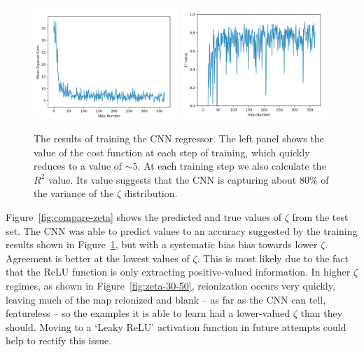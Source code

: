 \begin{figure}
\centering
\includegraphics[width=0.49\textwidth]{chapters/hera_ml/figures/zeta-MSE.png}
\includegraphics[width=0.49\textwidth]{chapters/hera_ml/figures/zeta-R2.png}
\caption[The results of training the CNN regressor.]{The results of training the CNN regressor. The left panel shows the value of the cost function at each step of training, which quickly reduces to a value of $\sim 5$. At each training step we also calculate the $R^2$ value. Its value suggests that the CNN is capturing about 80\% of the variance of the $\zeta$ distribution.}
\label{fig:CNN_training_results}
\end{figure}

Figure~\ref{fig:compare-zeta} shows the predicted and true values of $\zeta$ from the test set. The CNN was able to predict values to an accuracy suggested by the training results shown in Figure~\ref{fig:CNN_training_results}, but with a systematic bias bias towards lower $\zeta$. Agreement is better at the lowest values of $\zeta$. This is most likely due to the fact that the ReLU function is only extracting positive-valued information. In higher $\zeta$ regimes, as shown in Figure~\ref{fig:zeta-30-50}, reionization occurs very quickly, leaving much of the map reionized and blank -- as far as the CNN can tell, featureless -- so the examples it is able to learn had a lower-valued $\zeta$ than they should. Moving to a `Leaky ReLU' activation function in future attempts could help to rectify this issue.

